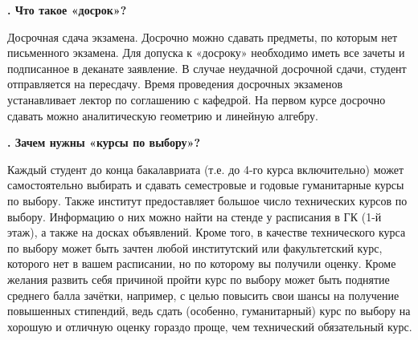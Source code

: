 \documentclass[14pt]{extarticle}
\newcounter{question}
\newcommand\Que[1]{%
    \begin{minipage}{\textwidth}
    \leavevmode\par
    \stepcounter{question}
    \noindent
    {\large\textbf{\thequestion. #1}}\par}
\newcommand\Ans[2][]{%
    \leavevmode\par\noindent
    {\leftskip37pt
    \textbf{#1}#2\par}
    \end{minipage}}
\begin{document}
\Que{Что такое «досрок»?}
\Ans{Досрочная сдача экзамена. Досрочно можно сдавать предметы, по которым нет письменного экзамена. Для допуска к «досроку» необходимо иметь все зачеты и подписанное в деканате заявление. В случае неудачной досрочной сдачи, студент отправляется на пересдачу. Время проведения досрочных экзаменов устанавливает лектор по соглашению с кафедрой. На первом курсе досрочно сдавать можно аналитическую геометрию и линейную алгебру.}

\Que{Зачем нужны «курсы по выбору»?}
\Ans{Каждый студент до конца бакалавриата (т.е. до 4-го курса включительно) может самостоятельно выбирать и сдавать семестровые и годовые гуманитарные курсы по выбору. Также институт предоставляет большое число технических курсов по выбору. Информацию о них можно найти на стенде у расписания в ГК (1-й этаж), а также на досках объявлений. Кроме того, в качестве технического курса по выбору может быть зачтен любой институтский или факультетский курс, которого нет в вашем расписании, но по которому вы получили оценку. Кроме желания развить себя причиной пройти курс по выбору может быть поднятие среднего балла зачётки, например, с целью повысить свои шансы на получение повышенных стипендий, ведь сдать (особенно, гуманитарный) курс по выбору на хорошую и отличную оценку гораздо проще, чем технический обязательный курс.}
\end{document}
